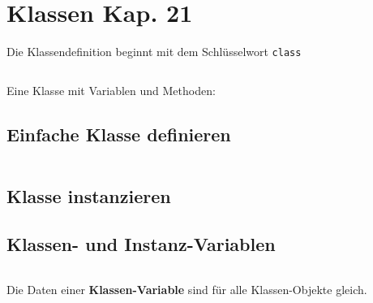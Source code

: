 
\begin{minipage}[t]{0.59\textwidth}
	\section[Klassen]{Klassen \tiny{Kap. 21}}
	Die Klassendefinition beginnt mit dem Schlüsselwort \texttt{class}
\end{minipage}
\begin{minipage}[t]{0.02\textwidth} $\quad$ \end{minipage}
\begin{minipage}[t]{0.39\textwidth}
	
\end{minipage}

\begin{minipage}[t]{0.59\textwidth}
	$\quad$\\[40pt]
	Eine Klasse mit Variablen und Methoden:
\end{minipage}\begin{minipage}[t]{0.02\textwidth}\end{minipage}
\begin{minipage}[t]{0.39\textwidth}
	
\end{minipage}

\begin{minipage}[t]{0.49\textwidth}
	\subsection{Einfache Klasse definieren}
	
\end{minipage}
\begin{minipage}[t]{0.02\textwidth} $\quad$ \end{minipage}
\begin{minipage}[t]{0.49\textwidth}
	\subsection{Klasse instanzieren}
	
\end{minipage}


\begin{minipage}[t]{0.49\textwidth}
	\subsection{Klassen- und Instanz-Variablen}
	
\end{minipage}
\begin{minipage}[t]{0.02\textwidth} $\quad$ \end{minipage}
\begin{minipage}[t]{0.49\textwidth}
	Die Daten einer \textbf{Klassen-Variable} sind für alle Klassen-Objekte gleich.
	
\end{minipage}\\[12pt]

